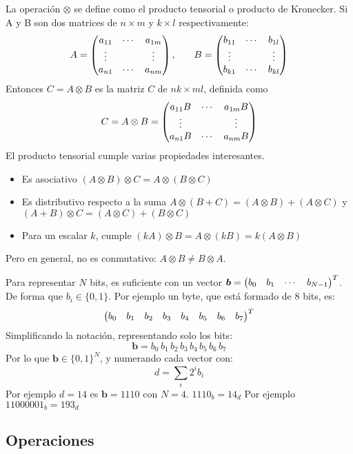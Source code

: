 La operación $\otimes$ se define como el producto tensorial o producto de 
Kronecker. Si A y B son dos matrices de $n \times m$ y $k \times l$ 
respectivamente:
%
$$
\begin{array}{c c}
	A=\begin{pmatrix} 
		a_{11} & \cdots & a_{1m} \\
		\vdots &        & \vdots \\
		a_{n1} & \cdots & a_{nm}
	 \end{pmatrix}
	,\quad
	&
	B=\begin{pmatrix} 
		b_{11} & \cdots & b_{1l} \\
		\vdots &        & \vdots \\
		b_{k1} & \cdots & b_{kl}
	 \end{pmatrix}
\end{array}
$$
%
Entonces $C = A \otimes B$ es la matriz $C$ de $nk \times ml$, definida como
%
$$
C = A \otimes B=\begin{pmatrix} 
	a_{11} B & \cdots & a_{1m} B \\
	\vdots   &        & \vdots   \\
	a_{n1} B & \cdots & a_{nm} B
 \end{pmatrix}
$$
%
El producto tensorial cumple varias propiedades interesantes.
%
\begin{itemize}
\item Es asociativo $(A \otimes B) \otimes C = A \otimes (B \otimes C)$

\item Es distributivo respecto a la suma $A \otimes (B + C) = (A \otimes B) + (A
\otimes C) $ y $(A + B) \otimes C = (A \otimes C) + (B \otimes C)$

\item Para un escalar $k$, cumple $(kA) \otimes B = A \otimes (kB) = k (A 
\otimes B)$
\end{itemize}
%
Pero en general, no es conmutativo: $A \otimes B \neq B \otimes A$.





Para representar $N$ bits, es suficiente con un vector $\boldsymbol{b} = 
\begin{pmatrix} b_0 & b_1 & \cdots & b_{N-1}  \end{pmatrix}^T$. De forma que $b_i \in \{0,1\}$. Por 
ejemplo un byte, que está formado de 8 bits, es:
$$\begin{pmatrix} b_0 & b_1 & b_2 & b_3 & b_4 & b_5 & b_6 & b_7 \end{pmatrix}^T$$
Simplificando la notación, representando solo los bits:
$$\boldsymbol{b} = b_0 \, b_1 \, b_2 \, b_3 \, b_4 \, b_5 \, b_6 \, b_7$$
Por lo que $\boldsymbol{b} \in \{0,1\}^N$, y numerando cada vector con:
$$d = \sum_i 2^i b_i$$
Por ejemplo $d=14$ es $\boldsymbol{b} = 1110$ con $N=4$. $1110_b = 14_d$
Por ejemplo $11000001_b = 193_d$


\subsection{Operaciones}



